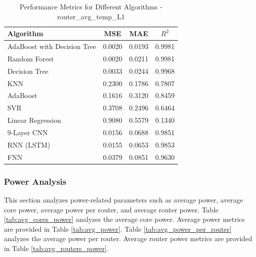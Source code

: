 \documentclass[conference]{IEEEtran}
\begin{document}
\begin{table}[htbp]
	\caption{Performance Metrics for Different Algorithms - router\_avg\_temp\_L1}
	\label{tab:router_avg_temp_L1}
	\begin{tabular}{lccc}
		\toprule
		\textbf{Algorithm} & \textbf{MSE} & \textbf{MAE} & \textbf{\(R^2\)} \\
		\midrule
		AdaBoost with Decision Tree & 0.0020 & 0.0193 & 0.9981 \\
		Random Forest & 0.0020 & 0.0211 & 0.9981 \\
		Decision Tree & 0.0033 & 0.0244 & 0.9968 \\
		KNN & 0.2300 & 0.1786 & 0.7807 \\
		AdaBoost & 0.1616 & 0.3120 & 0.8459 \\
		SVR & 0.3708 & 0.2496 & 0.6464 \\
		Linear Regression & 0.9080 & 0.5579 & 0.1340 \\
		9-Layer CNN                & 0.0156       & 0.0688       & 0.9851      \\ 
		RNN (LSTM)  & 0.0155       & 0.0653       & 0.9853      \\ 
		FNN                & 0.0379       & 0.0851       & 0.9630      \\ 
		\bottomrule
	\end{tabular}
\end{table}
	
	\subsubsection{Power Analysis}
	This section analyzes power-related parameters such as average power, average core power, average power per router, and average router power. Table \ref{tab:avg_cores_power} analyzes the average core power. Average power metrics are provided in Table \ref{tab:avg_power}. Table \ref{tab:avg_power_per_router} analyzes the average power per router. Average router power metrics are provided in Table \ref{tab:avg_routers_power}.
\end{document}
